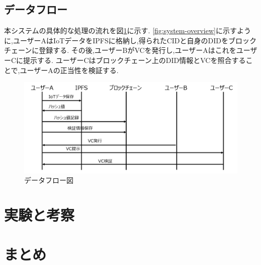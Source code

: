 \documentclass[a4paper,9pt,twocolumn]{ltjsarticle} %
\begin{document}
\subsection{データフロー}
本システムの具体的な処理の流れを図\ref{fig:system-flow}に示す.
\ref{fig:system-overview}に示すように,ユーザーAはIoTデータをIPFSに格納し,得られたCIDと自身のDIDをブロックチェーンに登録する.
その後,ユーザーBがVCを発行し,ユーザーAはこれをユーザーCに提示する.
ユーザーCはブロックチェーン上のDID情報とVCを照合することで,ユーザーAの正当性を検証する.

\begin{figure}[H]
  \centering
  \includegraphics[width=0.95\linewidth]{figure2.png}
  \caption{データフロー図}
  \label{fig:system-flow}
\end{figure}

\section{実験と考察}

\section{まとめ}



\end{document}
